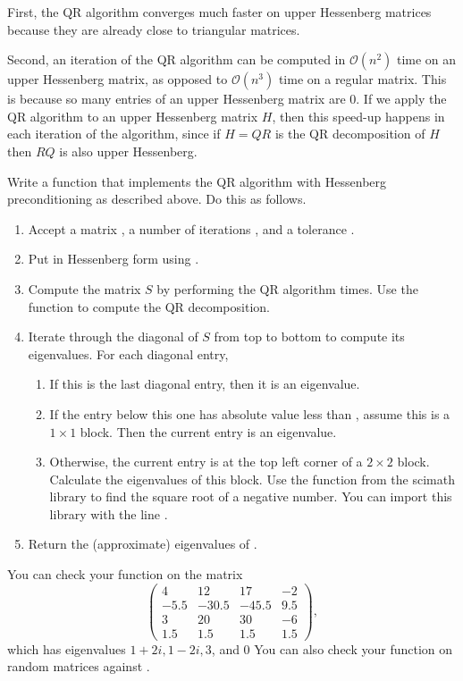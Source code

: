 First, the QR algorithm converges much faster on upper Hessenberg matrices because they are already close to triangular matrices.

Second, an iteration of the QR algorithm can be computed in $\mathcal{O}(n^2)$ time on an upper Hessenberg matrix, as opposed to $\mathcal{O}(n^3)$ time on a regular matrix.
This is because so many entries of an upper Hessenberg matrix are 0.
If we apply the QR algorithm to an upper Hessenberg matrix $H$, then this speed-up happens in each iteration of the algorithm, since if $H = QR$ is the QR decomposition of $H$ then $RQ$ is also upper Hessenberg.


\begin{problem}
Write a function that implements the QR algorithm with Hessenberg preconditioning as described above.
Do this as follows.
\begin{enumerate}
\item Accept a matrix , a number of iterations , and a tolerance .
\item Put  in Hessenberg form using .
\item Compute the matrix $S$ by performing the QR algorithm  times.
Use the function  to compute the QR decomposition.
\item Iterate through the diagonal of $S$ from top to bottom to compute its eigenvalues.
For each diagonal entry,
\begin{enumerate}
\item If this is the last diagonal entry, then it is an eigenvalue.
\item If the entry below this one has absolute value less than , assume this is a $1\times 1$ block.
Then the current entry is an eigenvalue.
\item Otherwise, the current entry is at the top left corner of a $2 \times 2$ block.
Calculate the eigenvalues of this block.
Use the  function from the scimath library to find the square root of a negative number.
You can import this library with the line .
\end{enumerate}
\item Return the (approximate) eigenvalues of .
\end{enumerate}
You can check your function on the matrix
\[
\begin{pmatrix}
 4 &  12 & 17 &  -2 \\
-5.5& -30.5 & -45.5 &  9.5\\
 3
&  20
& 30
&  -6
\\
1.5 &  1.5&   1.5&   1.5
       \end{pmatrix},
\]
which has eigenvalues $1+2i, 1-2i, 3$, and 0
You can also check your function on random matrices against .
\label{prob:qr_solver}
\end{problem}


